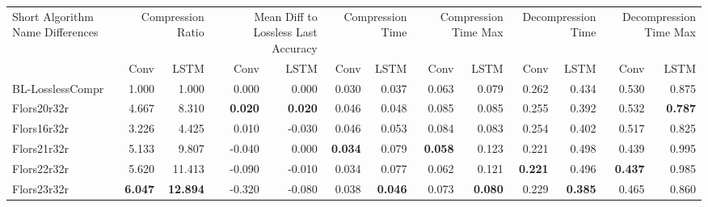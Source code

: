 \begin{tabular}{lrrrrrrrrrrrr}
\toprule
\multicolumn{1}{p{2.5cm}}{Short Algorithm Name Differences} & \multicolumn{2}{p{1.8cm}}{Compression Ratio} & \multicolumn{2}{p{1.8cm}}{Mean Diff to Lossless Last Accuracy} & \multicolumn{2}{p{1.8cm}}{Compression Time} & \multicolumn{2}{p{1.8cm}}{Compression Time Max} & \multicolumn{2}{p{1.8cm}}{Decompression Time} & \multicolumn{2}{p{1.8cm}}{Decompression Time Max} \\
 & Conv & LSTM & Conv & LSTM & Conv & LSTM & Conv & LSTM & Conv & LSTM & Conv & LSTM \\
\midrule
BL-LosslessCompr & 1.000 & 1.000 & 0.000 & 0.000 & 0.030 & 0.037 & 0.063 & 0.079 & 0.262 & 0.434 & 0.530 & 0.875 \\
Flors20r32r & 4.667 & 8.310 & \bfseries 0.020 & \bfseries 0.020 & 0.046 & 0.048 & 0.085 & 0.085 & 0.255 & 0.392 & 0.532 & \bfseries 0.787 \\
Flors16r32r & 3.226 & 4.425 & 0.010 & -0.030 & 0.046 & 0.053 & 0.084 & 0.083 & 0.254 & 0.402 & 0.517 & 0.825 \\
Flors21r32r & 5.133 & 9.807 & -0.040 & 0.000 & \bfseries 0.034 & 0.079 & \bfseries 0.058 & 0.123 & 0.221 & 0.498 & 0.439 & 0.995 \\
Flors22r32r & 5.620 & 11.413 & -0.090 & -0.010 & 0.034 & 0.077 & 0.062 & 0.121 & \bfseries 0.221 & 0.496 & \bfseries 0.437 & 0.985 \\
Flors23r32r & \bfseries 6.047 & \bfseries 12.894 & -0.320 & -0.080 & 0.038 & \bfseries 0.046 & 0.073 & \bfseries 0.080 & 0.229 & \bfseries 0.385 & 0.465 & 0.860 \\
\bottomrule
\end{tabular}

